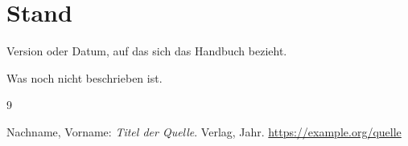 \documentclass[11pt,a4paper]{scrartcl}
\begin{document}
\section{Stand}\label{sec:stand}

\begin{description}[leftmargin=2.6cm,style=nextline,font=\sffamily\bfseries\small]
  \item[Gilt für] Version oder Datum, auf das sich das Handbuch bezieht.
  \item[Offen] Was noch nicht beschrieben ist.
\end{description}

\begin{thebibliography}{9}
\small
{} Nachname, Vorname: \emph{Titel der Quelle}. Verlag, Jahr.
  \url{https://example.org/quelle}
\end{thebibliography}
\end{document}
